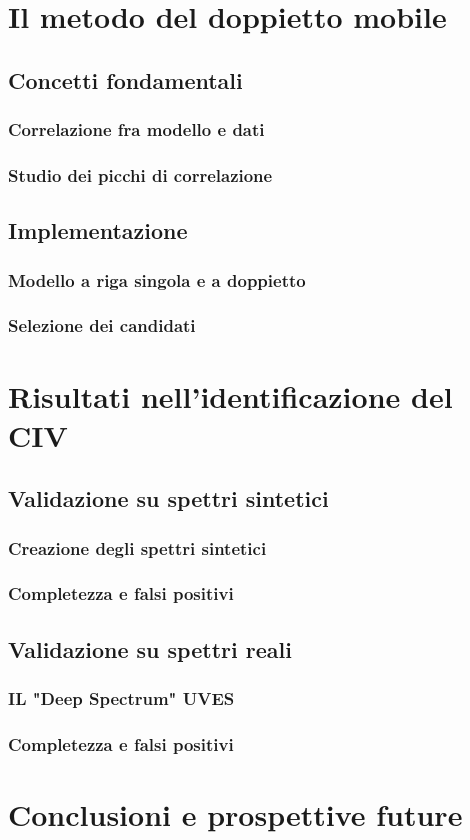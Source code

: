 \documentclass[a4paper,12pt]{article}
\begin{document}
\section{Il metodo del doppietto mobile}

\subsection{Concetti fondamentali}

\subsubsection{Correlazione fra modello e dati}

\subsubsection{Studio dei picchi di correlazione}

\subsection{Implementazione}

\subsubsection{Modello a riga singola e a doppietto}

\subsubsection{Selezione dei candidati}

\section{Risultati nell'identificazione del CIV}

\subsection{Validazione su spettri sintetici}

\subsubsection{Creazione degli spettri sintetici}

\subsubsection{Completezza e falsi positivi}

\subsection{Validazione su spettri reali}

\subsubsection{IL "Deep Spectrum" UVES}

\subsubsection{Completezza e falsi positivi}

\section{Conclusioni e prospettive future}
\end{document}
